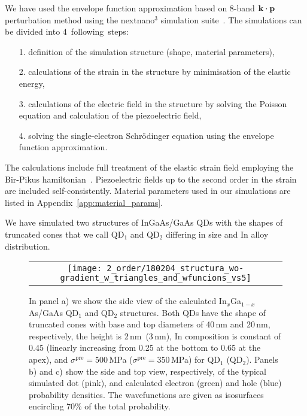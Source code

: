 %
We have used the envelope function approximation based on 8-band ${\bf k}\cdot{\bf p}$ perturbation method using the nextnano$^3$ simulation suite~\cite{Birner:07}. The simulations can be divided into 4~following~steps:
%
\begin{itemize}
	\item [1.] definition of the simulation structure (shape, material parameters),
	\item[2.] calculations of the strain in the structure by minimisation of the elastic energy,
	\item[3.] calculations of the electric field in the structure by solving the Poisson equation and calculation of the piezoelectric field,
	\item[4.] solving the single-electron Schrödinger equation using the envelope function approximation.
\end{itemize}
%
The calculations include full treatment of the elastic strain field employing the Bir-Pikus hamiltonian~\cite{BirPik}. Piezoelectric fields up to the second order in the strain are included self-consistently. Material parameters used in our simulations are listed in Appendix~\ref{app:material_params}. 





We have simulated two structures of InGaAs/GaAs QDs with the shapes of truncated cones that we call QD$_1$ and QD$_2$ differing in size and In alloy distribution.
%
\begin{figure}[!ht]
	\renewcommand{\tabcolsep}{2pt}
	\begin{center}
		\begin{tabular}{c}
			\texttt{[image: 2\_order/180204\_structura\_wo-gradient\_w\_triangles\_and\_wfuncions\_vs5]} \\ 
		\end{tabular}
	\end{center}
	\caption{In panel a) we show the side view of the calculated In$_{{x}}$Ga$_{1-x}$As/GaAs QD$_1$ and QD$_2$ structures. Both QDs have the shape of truncated cones with base and top diameters of 40$\,$nm and 20$\,$nm, respectively, the height is 2$\,$nm~(3$\,$nm), In composition is constant of 0.45 (linearly increasing from 0.25 at the bottom to 0.65 at the apex), and $\sigma^\text{pre}=500$$\,$MPa ($\sigma^\text{pre}=350$$\,$MPa) for QD$_1$ (QD$_2$). Panels b) and c) show the side and top view, respectively, of the typical simulated dot (pink), and calculated electron (green) and hole (blue) probability densities. The wavefunctions are given as isosurfaces encircling 70\% of the total probability.
		\label{fig:2order:QDStruct}}
\end{figure}

